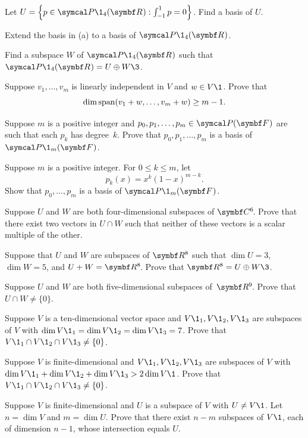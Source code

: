 \begin{exercises}
\exercise
\begin{SUBtheorem}
\item
Let $U = \br[\Big]{p \in \P\1_4(\R{}): \int_{-1}^1 p = 0}$. Find a basis of $U$.
\item
Extend the basis in (a) to a basis of $\P\1_4(\R{})$.
\item
Find a subspace $W$ of $\P\1_4(\R{})$ such that $\P\1_4(\R{}) = U \oplus W\3$.
\end{SUBtheorem}


\exercise
Suppose $v_1, \dots, v_m$ is linearly independent in $V$ and $w \in V\1$. Prove that
\[
\dim \operatorname{span}(v_1 + w, \dots, v_m + w) \ge m-1.
\]
\exercisedisplayend


\exercise
Suppose $m$ is a positive integer and $p_0, p_1, \dots, p_m \in \P(\F{})$ are such that each
$p_k$ has degree~$k$.  Prove that $p_0, p_1, \dots, p_m$ is a basis of $\P\1_m(\F{})$.


\exercise
Suppose $m$ is a positive integer. For $0 \le k \le m$, let
\[
p_k(x) = x^k (1-x)^{m-k}.
\]
Show that $p_0, \ldots, p_m$ is a basis of $\P\1_m(\F{})$.


\exercise
Suppose $U$ and $W$ are both four-dimensional subspaces of $\CC{6}$.
Prove that there exist two vectors in $U \cap W$ such that neither of these vectors is a scalar multiple of the other.


\exercise
Suppose that $U$ and $W$ are subspaces of $\R{8}$ such that $\dim U = 3$,
$\dim W = 5$, and $U + W = \RR{8}$.  Prove that $\R8 = U \oplus W\3$. \label{7exer}


\exercise
Suppose $U$ and $W$ are both five-dimensional subspaces of~$\RR{9}$.
Prove that $U \cap W \ne \{0\}$.


\exercise
Suppose $V$ is a ten-dimensional vector space and $V\1_1, V\1_2, V\1_3$ are subspaces of $V$ with
$\dim V\1_1 = \dim V\1_2 = \dim V\1_3 = 7$. Prove that $V\1_1 \cap V\1_2 \cap V\1_3 \ne \br{0}$.


\exercise
Suppose $V$ is finite-dimensional and $V\1_1, V\1_2, V\1_3$ are subspaces of $V$ with
$\dim V\1_1 + \dim V\1_2 + \dim V\1_3 > 2 \dim V\1$. Prove that $V\1_1 \cap V\1_2 \cap V\1_3 \ne \br{0}$.


\exercise
Suppose $V$ is finite-dimensional and $U$ is a subspace of $V$ with $U \ne V\1$. Let $n = \dim V$ and $m = \dim U$. Prove that there exist $n - m$ subspaces of $V\1$, each of dimension $n-1$, whose intersection equals $U$.



\end{exercises}
